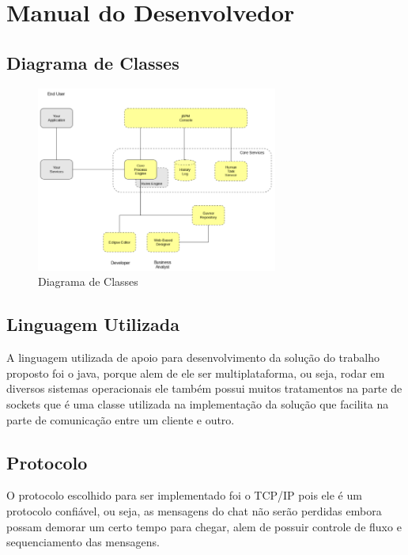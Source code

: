 \documentclass{abnt}
\begin{document}
\clearpage
\chapter{Manual do Desenvolvedor}
	\section{Diagrama de Classes}	
	
	\begin{figure}[htp]
		\begin{center}
			\includegraphics[width=300px]{jbpm_overview}
			\caption{Diagrama de Classes}
			\label{fig:jbpmOverview}
		\end{center}
	\end{figure}
	\FloatBarrier
	
	\section{Linguagem Utilizada}	
		A linguagem utilizada de apoio para desenvolvimento da solução do trabalho proposto foi o java, porque alem de ele ser multiplataforma, ou seja, rodar em diversos sistemas operacionais ele também possui muitos tratamentos na parte de sockets que é uma classe utilizada na implementação da solução que facilita na parte de comunicação entre um cliente e outro.
	
	\section{Protocolo}		
		O protocolo escolhido para ser implementado foi o TCP/IP pois ele é um protocolo confiável, ou seja, as mensagens do chat não serão perdidas embora possam demorar um certo tempo para chegar, alem de possuir controle de fluxo e sequenciamento das mensagens.



\clearpage
\nocite{*}
		
		
\end{document}
